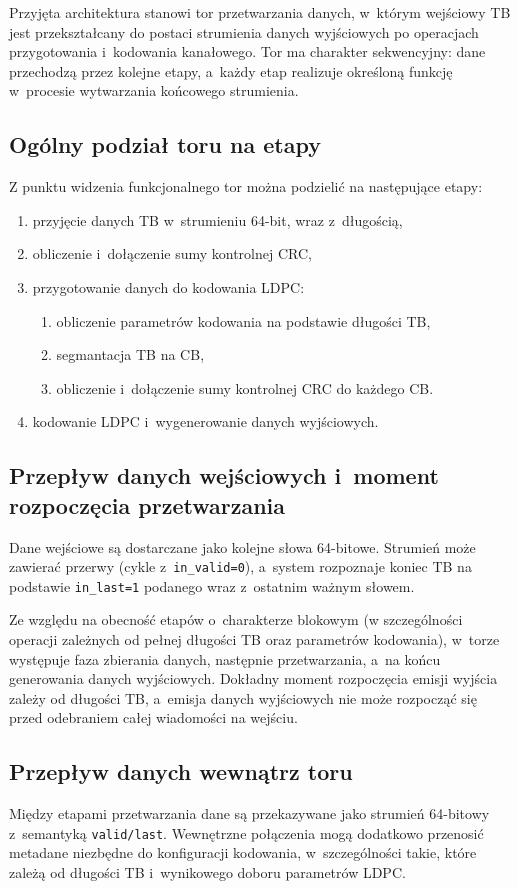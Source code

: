 Przyjęta architektura stanowi tor przetwarzania danych, w~którym wejściowy TB jest przekształcany do postaci strumienia danych wyjściowych po operacjach przygotowania i~kodowania kanałowego. Tor ma charakter sekwencyjny: dane przechodzą przez kolejne etapy, a~każdy etap realizuje określoną funkcję w~procesie wytwarzania końcowego strumienia.

\subsection{Ogólny podział toru na etapy}
Z punktu widzenia funkcjonalnego tor można podzielić na następujące etapy:
\begin{enumerate}
    \item przyjęcie danych TB w~strumieniu 64-bit, wraz z~długością,
    \item obliczenie i~dołączenie sumy kontrolnej CRC,
    \item przygotowanie danych do kodowania LDPC:
    \begin{enumerate}
        \item obliczenie parametrów kodowania na podstawie długości TB,
        \item segmantacja TB na CB,
        \item obliczenie i~dołączenie sumy kontrolnej CRC do każdego CB.
    \end{enumerate}
    \item kodowanie LDPC i~wygenerowanie danych wyjściowych.
\end{enumerate}

\subsection{Przepływ danych wejściowych i~moment rozpoczęcia przetwarzania}
Dane wejściowe są dostarczane jako kolejne słowa 64-bitowe. Strumień może zawierać przerwy (cykle z~\texttt{in\_valid=0}), a~system rozpoznaje koniec TB na podstawie \texttt{in\_last=1} podanego wraz z~ostatnim ważnym słowem.

Ze względu na obecność etapów o~charakterze blokowym (w szczególności operacji zależnych od pełnej długości TB oraz parametrów kodowania), w~torze występuje faza zbierania danych, następnie przetwarzania, a~na końcu generowania danych wyjściowych. Dokładny moment rozpoczęcia emisji wyjścia zależy od długości TB, a~emisja danych wyjściowych nie może rozpocząć się przed odebraniem całej wiadomości na wejściu.

\subsection{Przepływ danych wewnątrz toru}
Między etapami przetwarzania dane są przekazywane jako strumień 64-bitowy z~semantyką \texttt{valid/last}. Wewnętrzne połączenia mogą dodatkowo przenosić metadane niezbędne do konfiguracji kodowania, w~szczególności takie, które zależą od długości TB i~wynikowego doboru parametrów LDPC.

